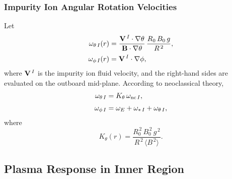 \documentclass[12pt,prb,aps]{revtex4-1}
\begin{document}
\subsubsection{Impurity Ion Angular Rotation Velocities}\label{srotation}
Let
\begin{align}
\omega_{\theta\,I}(r)&=\frac{{\bf V}^{\,I}\cdot\nabla\theta}{{\bf B}\cdot\nabla\theta}\,\frac{R_0\,B_0\,g}{R^{\,2}},\\[0.5ex]
\omega_{\phi\,I}(r) &= {\bf V}^{\,I}\cdot\nabla\phi,
\end{align}
where ${\bf V}^{\,I}$ is the impurity ion fluid velocity, and the right-hand sides are evaluated on the outboard mid-plane. According to neoclassical theory,\,\cite{rftor3}
\begin{align}
\omega_{\theta\,I} &= K_\theta\,\omega_{{\rm nc}\,I},\\[0.5ex]
\omega_{\phi\,I} &= \omega_E+\omega_{\ast\,I} + \omega_{\theta\,I},
\end{align}
where
\begin{equation}
K_\theta(r) = \frac{R_0^{\,2}\,B_0^{\,2}\,g^{\,2}}{R^{\,2}\,\langle B^{\,2}\rangle}.
\end{equation}

\subsection{Plasma Response in Inner Region}
\end{document}
